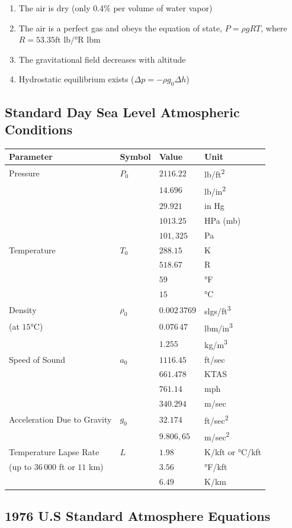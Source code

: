 \documentclass[
]{book}
\providecommand{\tightlist}{%
  \setlength{\itemsep}{0pt}\setlength{\parskip}{0pt}}
\begin{document}
\begin{enumerate}
\def\labelenumi{\arabic{enumi}.}
\tightlist
\item
  The air is dry (only 0.4\% per volume of water vapor)
\item
  The air is a perfect gas and obeys the equation of state, \(P = \rho gRT\), where \(R = 53.35 \text{ft lb/°R lbm}\)
\item
  The gravitational field decreases with altitude
\item
  Hydrostatic equilibrium exists (\(\Delta p = −\rho g_0 \Delta h\))
\end{enumerate}

\hypertarget{standard-day-sea-level-atmospheric-conditions}{%
\subsection*{Standard Day Sea Level Atmospheric Conditions}\label{standard-day-sea-level-atmospheric-conditions}}

\begin{longtable}[]{@{}llll@{}}
\toprule
Parameter & Symbol & Value & Unit\tabularnewline
\midrule
\endhead
Pressure & \(P_0\) & \(2116.22\) & lb/ft\textsuperscript{2}\tabularnewline
& & \(14.696\) & lb/in\textsuperscript{2}\tabularnewline
& & \(29.921\) & in Hg\tabularnewline
& & \(1013.25\) & HPa (mb)\tabularnewline
& & \(101,325\) & Pa\tabularnewline
Temperature & \(T_0\) & \(288.15\) & K\tabularnewline
& & \(518.67\) & R\tabularnewline
& & \(59\) & °F\tabularnewline
& & \(15\) & °C\tabularnewline
Density & \(\rho_0\) & \(0.002\,3769\) & slgs/ft\textsuperscript{3}\tabularnewline
(at \(15°\)C) & & \(0.076\,47\) & lbm/in\textsuperscript{3}\tabularnewline
& & \(1.255\) & kg/m\textsuperscript{3}\tabularnewline
Speed of Sound & \(a_0\) & \(1116.45\) & ft/sec\tabularnewline
& & \(661.478\) & KTAS\tabularnewline
& & \(761.14\) & mph\tabularnewline
& & \(340.294\) & m/sec\tabularnewline
Acceleration Due to Gravity & \(g_0\) & \(32.174\) & ft/sec\textsuperscript{2}\tabularnewline
& & \(9.806,65\) & m/sec\textsuperscript{2}\tabularnewline
Temperature Lapse Rate & \(L\) & \(1.98\) & K/kft or °C/kft\tabularnewline
(up to \(36\,000\) ft or \(11\) km) & & \(3.56\) & °F/kft\tabularnewline
& & \(6.49\) & K/km\tabularnewline
\bottomrule
\end{longtable}

\hypertarget{u.s-standard-atmosphere-equations}{%
\subsection*{1976 U.S Standard Atmosphere Equations}\label{u.s-standard-atmosphere-equations}}
\end{document}
